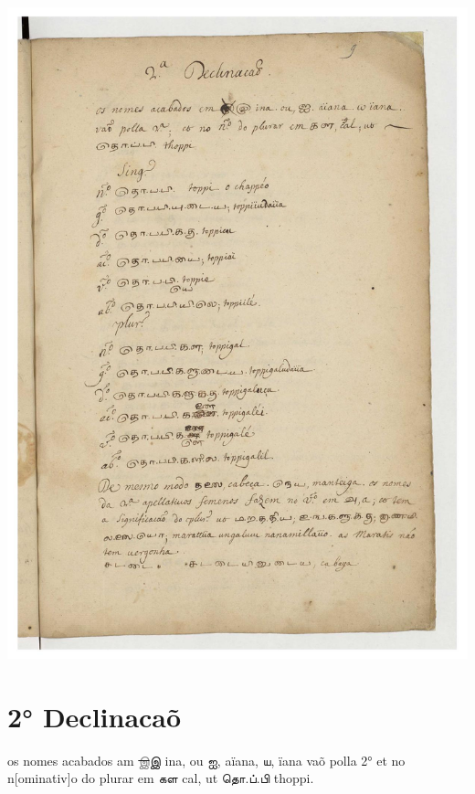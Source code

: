 \documentclass[12pt,a4paper]{scrbook}
\begin{document}
        
\newpage
\hypertarget{img-27}{
    \includegraphics[width=\textwidth]{img-27}}
\newpage
        \chapter*{2° Declinacaõ}
    
        


            os nomes acabados am \sout{\textcolor{gray}{இ}}இ ina, ou ஐ, aïana, ய, ïana 
            vaõ polla 2° et no n[ominativ]o do plurar em கள cal, 
            ut தொ.ப்.பி thoppi.
        
\end{document}
